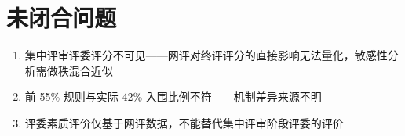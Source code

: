 \documentclass[UTF8]{ctexart}
\begin{document}
\section{未闭合问题}

\begin{enumerate}
    \item 集中评审评委评分不可见——网评对终评评分的直接影响无法量化，敏感性分析需做秩混合近似
    \item 前 55\% 规则与实际 42\% 入围比例不符——机制差异来源不明
    \item 评委素质评价仅基于网评数据，不能替代集中评审阶段评委的评价
\end{enumerate}
\end{document}
